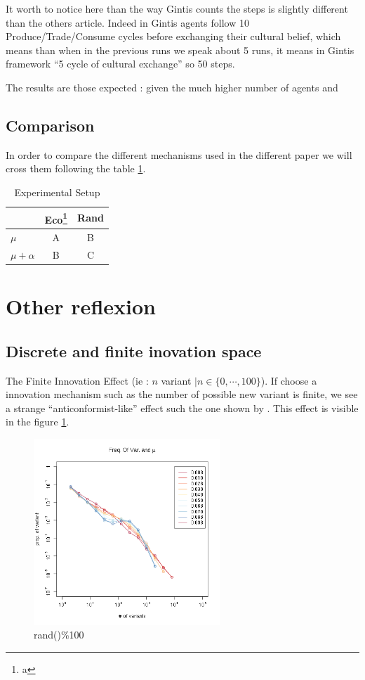 \documentclass[a4paper]{article}
\begin{document}
It worth to notice here than the way Gintis counts the steps is slightly different than the others article. Indeed in Gintis agents follow 10 Produce/Trade/Consume cycles before exchanging their cultural belief, which means than when in the previous runs we speak about 5 runs, it means in Gintis framework ``5 cycle of cultural exchange'' so 50 steps.

The results are those expected : given the much higher number of agents and 


\subsection{Comparison}
In order to compare the different mechanisms used in the different paper we will cross them  following the table \ref{tab:exp}.
\begin{table}
	\centering
	\begin{tabular}{l|c|c}
		& Eco\footnote{a} & Rand \\\hline
		$\mu$ &A & B \\
		$\mu +\alpha$ & B & C \\
	\end{tabular}
	\caption{Experimental Setup}
	\label{tab:exp}
\end{table}




\section{Other reflexion}
\subsection{Discrete and finite inovation space}
The Finite Innovation Effect (ie : $n$ variant  $| n\in\{0,\cdots,100\}$). If choose a innovation mechanism such as the number of possible new variant is finite, we see a strange ``anticonformist-like'' effect such the one shown by \cite{mesoudi2009randomcopyingfrequencydependencopyingandulturechange}. This effect is visible in the figure \ref{fig:finitEffect}.
\begin{figure}[h]
	\begin{center}
		\includegraphics[width=7cm]{img/allmu.png}
	\end{center}
	\caption{rand()\%100}
	\label{fig:finitEffect}
\end{figure}
\end{document}
